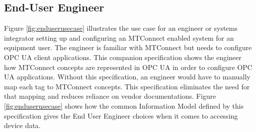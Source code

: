 
\FloatBarrier

\subsection{End-User Engineer}

Figure \ref{fig:enduserusecase} illustrates the use case for an engineer or systems integrator setting up and configuring an MTConnect enabled system for an equipment user. The engineer is familiar with MTConnect but needs to configure OPC UA client applications. This companion specification shows the engineer how MTConnect concepts are represented in OPC UA in order to configure OPC UA applications. Without this specification, an engineer would have to manually map each tag to MTConnect concepts. This specification eliminates the need for that mapping and reduces reliance on vendor documentations.  Figure \ref{fig:enduserusecase} shows how the common Information Model defined by this specification gives the End User Engineer choices when it comes to accessing device data.


\FloatBarrier
